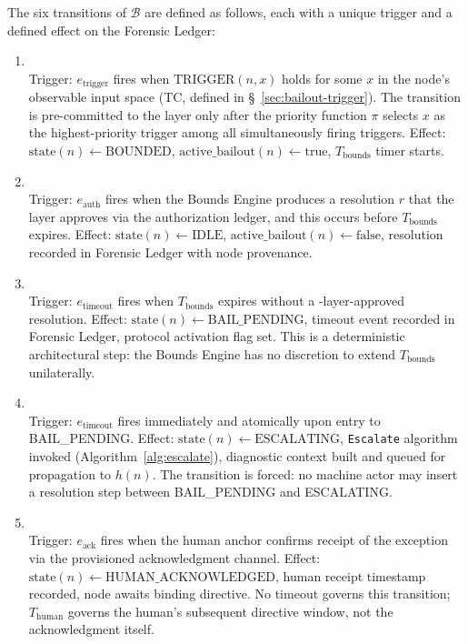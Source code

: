 The six transitions of $\mathcal{B}$ are defined as follows, each with a unique trigger and a defined effect on the Forensic Ledger:

\begin{enumerate}\itemsep=0pt
\item[\textbf{T1 (IDLE $\rightarrow$ BOUNDED):}] \hfill \\ Trigger: $e_{\text{trigger}}$ fires when $\text{TRIGGER}(n, x)$ holds for some $x$ in the node's observable input space (TC, defined in \S~\ref{sec:bailout-trigger}). The transition is pre-committed to the \fact{} layer only after the priority function $\pi$ selects $x$ as the highest-priority trigger among all simultaneously firing triggers. Effect: $\text{state}(n) \leftarrow \text{BOUNDED}$, $\text{active\_bailout}(n) \leftarrow \text{true}$, $T_{\text{bounds}}$ timer starts.

\item[\textbf{T2 (BOUNDED $\rightarrow$ IDLE):}] \hfill \\ Trigger: $e_{\text{auth}}$ fires when the Bounds Engine produces a resolution $r$ that the \fact{} layer approves via the authorization ledger, and this occurs before $T_{\text{bounds}}$ expires. Effect: $\text{state}(n) \leftarrow \text{IDLE}$, $\text{active\_bailout}(n) \leftarrow \text{false}$, resolution recorded in Forensic Ledger with node provenance.

\item[\textbf{T3 (BOUNDED $\rightarrow$ BAIL\_PENDING):}] \hfill \\ Trigger: $e_{\text{timeout}}$ fires when $T_{\text{bounds}}$ expires without a \fact-layer-approved resolution. Effect: $\text{state}(n) \leftarrow \text{BAIL\_PENDING}$, timeout event recorded in Forensic Ledger, protocol activation flag set. This is a deterministic architectural step: the Bounds Engine has no discretion to extend $T_{\text{bounds}}$ unilaterally.

\item[\textbf{T4 (BAIL\_PENDING $\rightarrow$ ESCALATING):}] \hfill \\ Trigger: $e_{\text{timeout}}$ fires immediately and atomically upon entry to BAIL\_PENDING. Effect: $\text{state}(n) \leftarrow \text{ESCALATING}$, \texttt{Escalate} algorithm invoked (Algorithm~\ref{alg:escalate}), diagnostic context built and queued for propagation to $h(n)$. The transition is forced: no machine actor may insert a resolution step between BAIL\_PENDING and ESCALATING.

\item[\textbf{T5 (ESCALATING $\rightarrow$ HUMAN\_ACKNOWLEDGED):}] \hfill \\ Trigger: $e_{\text{ack}}$ fires when the human anchor confirms receipt of the exception via the provisioned acknowledgment channel. Effect: $\text{state}(n) \leftarrow \text{HUMAN\_ACKNOWLEDGED}$, human receipt timestamp recorded, node awaits binding directive. No timeout governs this transition; $T_{\text{human}}$ governs the human's subsequent directive window, not the acknowledgment itself.


\end{enumerate}
